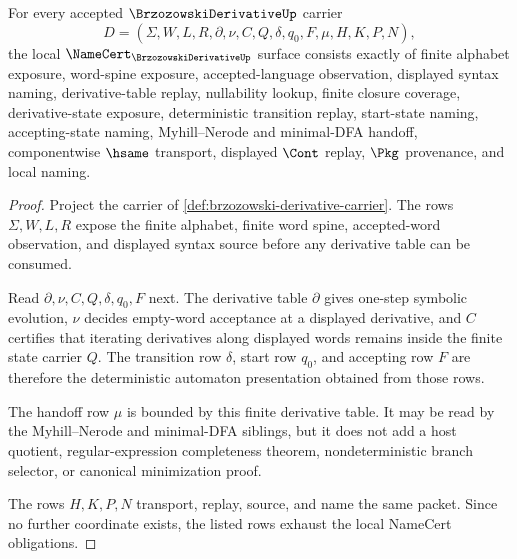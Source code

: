 \begin{theorem}
\label{thm:brzozowski-derivative-namecert-obligations}
For every accepted $\BrzozowskiDerivativeUp$ carrier
$$
D=(\Sigma,W,L,R,\partial,\nu,C,Q,\delta,q_0,F,\mu,H,K,P,N),
$$
the local $\NameCert_{\BrzozowskiDerivativeUp}$ surface consists exactly of finite alphabet exposure, word-spine exposure, accepted-language observation, displayed syntax naming, derivative-table replay, nullability lookup, finite closure coverage, derivative-state exposure, deterministic transition replay, start-state naming, accepting-state naming, Myhill--Nerode and minimal-DFA handoff, componentwise $\hsame$ transport, displayed $\Cont$ replay, $\Pkg$ provenance, and local naming.
\end{theorem}
\begin{proof}
Project the carrier of \autoref{def:brzozowski-derivative-carrier}. The rows $\Sigma,W,L,R$ expose the finite alphabet, finite word spine, accepted-word observation, and displayed syntax source before any derivative table can be consumed.

Read $\partial,\nu,C,Q,\delta,q_0,F$ next. The derivative table $\partial$ gives one-step symbolic evolution, $\nu$ decides empty-word acceptance at a displayed derivative, and $C$ certifies that iterating derivatives along displayed words remains inside the finite state carrier $Q$. The transition row $\delta$, start row $q_0$, and accepting row $F$ are therefore the deterministic automaton presentation obtained from those rows.

The handoff row $\mu$ is bounded by this finite derivative table. It may be read by the Myhill--Nerode and minimal-DFA siblings, but it does not add a host quotient, regular-expression completeness theorem, nondeterministic branch selector, or canonical minimization proof.

The rows $H,K,P,N$ transport, replay, source, and name the same packet. Since no further coordinate exists, the listed rows exhaust the local NameCert obligations.
\end{proof}

